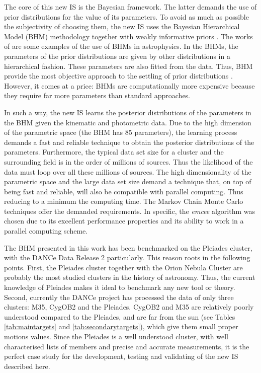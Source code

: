 The core of this new IS is the Bayesian framework. The latter demands the use of prior distributions for the value of its parameters. To avoid as much as possible the subjectivity of choosing them, the new IS uses the Bayesian Hierarchical Model (BHM) methodology together with weakly informative priors  \cite[see]{Gelman2006,Gelman2008,Huang2013,Chung2015}. The works of \citet{Jefferys2007,Shkedy2007,Hogg2010,Sale2012, Feeney2013} are some examples of the use of BHMs in astrophysics. In the BHMs, the parameters of the prior distributions are given by other distributions in a hierarchical fashion. These parameters are also fitted from the data. Thus, BHM provide the most objective approach to the settling of prior distributions \citep{Gelman2006}. However, it comes at a price: BHMs are computationally more expensive because they require far more parameters than standard approaches. 

In such a way, the new IS learns the posterior distributions of the parameters in the BHM given the kinematic and photometric data. Due to the high dimension of the parametric space (the BHM has 85 parameters), the learning process demands a fast and reliable technique to obtain the posterior distributions of the parameters. Furthermore, the typical data set size for a cluster and the surrounding field is in the order of millions of sources. Thus the likelihood of the data must loop over all these millions of sources. The high dimensionality of the parametric space and the large data set size demand a technique that, on top of being fast and reliable, will also be compatible with parallel computing. Thus reducing to a minimum the computing time. The Markov Chain Monte Carlo techniques offer the demanded requirements. In specific, the \emph{emcee} algorithm \citep{Foreman2013} was chosen due to  its excellent performance properties and its ability to work in a parallel computing scheme.  

The BHM presented in this work has been benchmarked on the Pleiades cluster, with the DANCe Data Release 2 \cite[DR2,]{Bouy2015} particularly. This reason roots in the following points. First, the Pleiades cluster together with the Orion Nebula Cluster are probably the most studied clusters in the history of astronomy. Thus, the current knowledge of Pleiades makes it ideal to benchmark any new tool or theory. Second, currently the DANCe project has processed the data of only three clusters: M35, CygOB2 and the Pleiades. CygOB2 and M35 are relatively poorly understood compared to the Pleiades, and are far from the sun (see Tables \ref{tab:maintargets} and \ref{tab:secondarytargets}), which give them small proper motions values. Since the Pleiades is a well understood cluster, with well characterised lists of members \cite[e.g][]{Stauffer2007, Lodieu2012, Sarro2014, Bouy2015} and precise and accurate measurements, it is the perfect case study for the development, testing and validating of the new IS described here.


